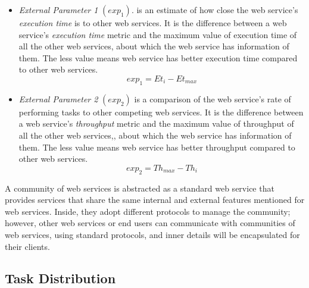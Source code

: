 \begin{itemize}
  \item \emph{External Parameter 1} $(exp_1)$. is an estimate of how close the web service's \emph{execution time} is to other web services. It is the difference between a web service's \emph{execution time} metric and the maximum value of execution time of all the other web services, about which the web service has information of them. The less value means web service has better execution time compared to other web services.
	\begin{equation}\label{exp_1:f}
		exp_1 = Et_{i} - Et_{max}
	\end{equation}
	\item \emph{External Parameter 2} $(exp_2)$ is a comparison of the web service's rate of performing tasks to other competing web services. It is the difference between a web service's \emph{throughput} metric and the maximum value of throughput of all the other web services,, about which the web service has information of them. The less value means web service has better throughput compared to other web services.
	\begin{equation}\label{exp_2Lf}
		exp_2 = Th_{max} - Th_{i}
	\end{equation}
\end{itemize}

A community of web services is abstracted as a standard web service that provides services that share the same internal and external features mentioned for web services. Inside, they adopt different protocols to manage the community; however, other web services or end users can communicate with communities of web services, using standard protocols, and inner details will be encapsulated for their clients.

\subsection{Task Distribution}

